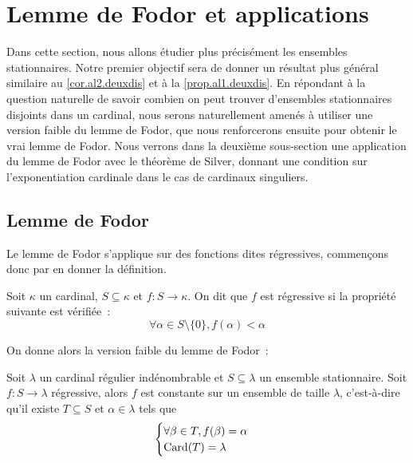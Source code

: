 \section{Lemme de Fodor et applications}

Dans cette section, nous allons étudier plus précisément les ensembles
stationnaires. Notre premier objectif sera de donner un résultat plus général
similaire au \cref{cor.al2.deuxdis} et à la \cref{prop.al1.deuxdis}. En
répondant à la question naturelle de savoir combien on peut trouver d'ensembles
stationnaires disjoints dans un cardinal, nous serons naturellement amenés à
utiliser une version faible du lemme de Fodor, que nous renforcerons ensuite
pour obtenir le vrai lemme de Fodor. Nous verrons dans la deuxième sous-section
une application du lemme de Fodor avec le théorème de Silver, donnant une
condition sur l'exponentiation cardinale dans le cas de cardinaux singuliers.

\subsection{Lemme de Fodor}

Le lemme de Fodor s'applique sur des fonctions dites régressives, commençons
donc par en donner la définition.

\begin{definition}
  Soit $\kappa$ un cardinal, $S\subseteq \kappa$ et $f : S \to \kappa$. On
  dit que $f$ est régressive si la propriété suivante est vérifiée~:
  \[\forall \alpha \in S\setminus\{0\}, f(\alpha) < \alpha\]
\end{definition}

On donne alors la version faible du lemme de Fodor~:

\begin{lemma}\label{lem.fodor.faible}
  Soit $\lambda$ un cardinal régulier indénombrable et $S\subseteq \lambda$ un
  ensemble stationnaire. Soit $f : S \to \lambda$ régressive, alors $f$ est
  constante sur un ensemble de taille $\lambda$, c'est-à-dire qu'il existe
  $T\subseteq S$ et $\alpha \in \lambda$ tels que
  \[\begin{cases}
  \forall \beta \in T, f(\beta) = \alpha\\
  \operatorname{Card}(T) = \lambda
  \end{cases}\]
\end{lemma}

